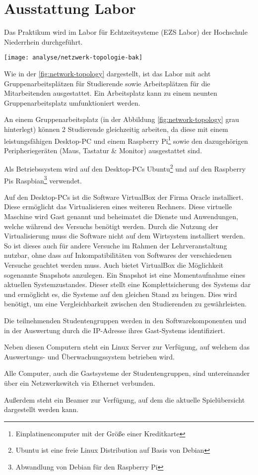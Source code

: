 \section{Ausstattung Labor}
\label{sec:Ausstattung_Labor}

Das Praktikum wird im Labor für Echtzeitsysteme (EZS Labor) der Hochschule Niederrhein durchgeführt.

\begin{center}
	\texttt{[image: analyse/netzwerk-topologie-bak]}
	\label{fig:network-topology}
\end{center}

Wie in der \autoref{fig:network-topology} dargestellt, ist das Labor mit acht Gruppenarbeitsplätzen für Studierende sowie Arbeitsplätzen für die Mitarbeitenden ausgestattet. Ein Arbeitsplatz kann zu einem neunten Gruppenarbeitsplatz umfunktioniert werden.

An einem Gruppenarbeitsplatz (in der Abbildung \ref{fig:network-topology} grau hinterlegt) können 2 Studierende gleichzeitig arbeiten, da diese mit einem leistungsfähigen Desktop-PC und einem Raspberry Pi\footnote{Einplatinencomputer mit der Größe einer Kreditkarte} sowie den dazugehörigen Peripheriegeräten (Maus, Tastatur \& Monitor) ausgestattet sind.

Als Betriebssystem wird auf den Desktop-PCs Ubuntu\footnote{Ubuntu ist eine freie Linux Distribution auf Basis von Debian} und auf den Raspberry Pis Raspbian\footnote{Abwandlung von Debian für den Raspberry Pi} verwendet.

Auf den Desktop-PCs ist die Software VirtualBox der Firma Oracle installiert. Diese ermöglicht das Virtualisieren eines weiteren Rechners. Diese virtuelle Maschine wird Gast genannt und beheimatet die Dienste und Anwendungen, welche während des Versuchs benötigt werden. Durch die Nutzung der Virtualisierung muss die Software nicht auf dem Wirtsystem installiert werden. So ist dieses auch für andere Versuche im Rahmen der Lehrveranstaltung nutzbar, ohne dass auf Inkompatibilitäten von Softwares der verschiedenen Versuche geachtet werden muss. Auch bietet VirtualBox die Möglichkeit sogenannte Snapshots anzulegen. Ein Snapshot ist eine Momentaufnahme eines aktuellen Systemzustandes. Dieser stellt eine Komplettsicherung des Systems dar und ermöglicht es, die Systeme auf den gleichen Stand zu bringen. \cite{oraclecorporationOracleVMVirtualBox2020} Dies wird benötigt, um eine Vergleichbarkeit zwischen den Studierenden zu gewährleisten.

Die teilnehmenden Studentengruppen werden in den Softwarekomponenten und in der Auswertung durch die IP-Adresse ihres Gast-Systems identifiziert.

Neben diesen Computern steht ein Linux Server zur Verfügung, auf welchem das \linebreak
Auswertungs- und Überwachungssystem betrieben wird.

Alle Computer, auch die Gastsysteme der Studentengruppen, sind untereinander über ein Netzwerkswitch via Ethernet verbunden.

Außerdem steht ein Beamer zur Verfügung, auf dem die aktuelle Spielübersicht dargestellt werden kann.